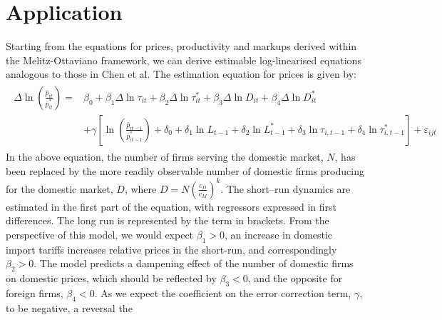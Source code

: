 \section{Application}\label{sec:app}
Starting from the equations for prices, productivity and markups derived within the Melitz-Ottaviano framework, we can derive estimable log-linearised equations analogous to those in Chen et al. The estimation equation for prices is given by:
\begin{align}
\begin{split}\label{eq:gw-estimation-prices}
\Delta \ln \left( \frac{\bar{p}_{it}}{\bar{p}_{it}^*} \right) = &\beta_0 + \beta_1 \Delta \ln \tau_{it} + \beta_2 \Delta \ln \tau_{it}^* + \beta_3 \Delta \ln D_{it} + \beta_4 \Delta \ln D_{it}^* \\ &+ \gamma \left[ \ln \left( \frac{\bar{p}_{it-1}}{\bar{p}_{it-1}^*} \right) + \delta_0 + \delta_1 \ln L_{t-1} + \delta_2\ln L_{t-1}^* + \delta_3 \ln  \tau_{i,t-1} + \delta_4 \ln  \tau_{i,t-1}^* \right] + \varepsilon_{ijt} 
\end{split}\end{align}
In the above equation, the number of firms serving the domestic market, $N$, has been replaced by the more readily observable number of domestic firms producing for the domestic market, $D$, where $D=N \left( \frac{c_D}{c_M} \right)^k$. The short--run dynamics are estimated in the first part of the equation, with regressors expressed in first differences. The long run is represented by the term in brackets. From the perspective of this model, we would expect $\beta_1>0$, an increase in domestic import tariffs increases relative prices in the short-run, and correspondingly $\beta_2>0$. The model predicts a dampening effect of the number of domestic firms on domestic prices, which should be reflected by $\beta_3<0$, and the opposite for foreign firms, $\beta_4<0$. As we expect the coefficient on the error correction term, $\gamma$, to be negative, a reversal the 

